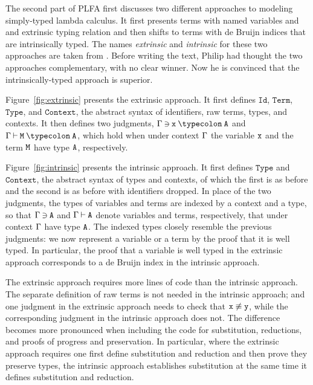 \documentclass[preprint,authoryear]{elsarticle}
\begin{document}
The second part of PLFA first discusses two different approaches to
modeling simply-typed lambda calculus.  It first presents
terms with named variables and and extrinsic typing relation and
then shifts to terms with de Bruijn indices that are intrinsically
typed.  The names \emph{extrinsic} and \emph{intrinsic} for these
two approaches are taken from \citet{Reynolds-2003}.
Before writing the text, Philip had thought the two approaches
complementary, with no clear winner.  Now he is convinced that the
intrinsically-typed approach is superior.

Figure~\ref{fig:extrinsic} presents the extrinsic approach.
It first defines $\texttt{Id}$, $\texttt{Term}$,
$\texttt{Type}$, and $\texttt{Context}$, the abstract syntax
of identifiers, raw terms, types, and contexts.
It then defines two judgments,
$\GG\:{\ni}\:\ex\:{\typecolon}\:\AY$ and
$\GG\:{\vdash}\:\EM\:{\typecolon}\:\AY$,
which hold when under context $\Gamma$ the variable $\texttt{x}$
and the term $\texttt{M}$ have type $\texttt{A}$, respectively.

Figure~\ref{fig:intrinsic} presents the intrinsic approach.
It first defines $\texttt{Type}$ and $\texttt{Context}$, the abstract syntax
of types and contexts, of which the first is as before and the second is
as before with identifiers dropped.  In place of the two judgments,
the types of variables and terms are indexed by a context and a type,
so that $\Gamma\:{\ni}\:\texttt{A}$ and $\Gamma\:{\vdash}\:\texttt{A}$ denote
variables and terms, respectively, that under context $\Gamma$ have type $\texttt{A}$.
The indexed types closely resemble the previous judgments:
we now represent a variable or a term by the proof that it is well typed.
In particular, the proof that a variable is well typed in the extrinsic approach
corresponds to a de Bruijn index in the intrinsic approach.

The extrinsic approach requires more lines of code than the intrinsic approach.  The
separate definition of raw terms is not needed in the intrinsic approach; and one
judgment in the extrinsic approach needs to check that $\texttt{x} \not\equiv \texttt{y}$, while
the corresponding judgment in the intrinsic approach does not.  The difference
becomes more pronounced when including the code for substitution, reductions,
and proofs of progress and preservation.  In particular, where the extrinsic approach
requires one first define substitution and reduction and then prove they
preserve types, the intrinsic approach establishes substitution at the same time
it defines substitution and reduction.
\end{document}
